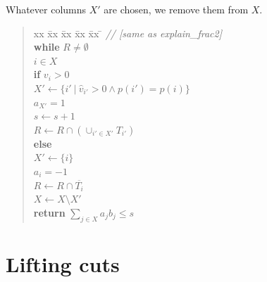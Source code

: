 \documentclass{article}
\begin{document}
Whatever columns $X'$ are chosen, we remove them from $X$.



\begin{quote} 
\begin{tabbing}
    xx \= xx \= xx \= xx \= xx \= \kill
    \> \textit{// [same as explain\_frac2]} \\
    \> \textbf{while} $R \neq \emptyset$ \\
    \> \>  $i \in X$ \\
    \> \> \textbf{if} $v_i > 0$ \\
    \> \> \> $X' \gets \{i' ~|~ \hat{v}_{i'} > 0 \land p(i') = p(i)\}$ \\
    \> \> \> $a_{X'} = 1$\\
    \> \> \> $s \gets s + 1$ \\
    \> \> \> $R \gets R \cap (\cup_{i' \in X'} T_{i'})$ \\
    \> \> \textbf{else} \\
    \> \> \> $X' \gets \{i\}$ \\
    \> \> \> $a_i = -1$\\
    \> \> \> $R \gets R \cap \overline{T_i}$ \\
    \> \> $X \gets X \setminus X'$ \\
    \> \textbf{return} $\sum_{j \in X} a_j b_j \leq s$
\end{tabbing}
\end{quote}



\section{Lifting cuts}
\end{document}
